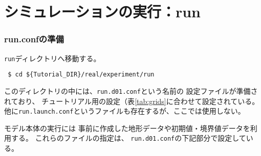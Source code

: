 \section{シミュレーションの実行：run} \label{sec:tutrial_real_run}
\subsubsection{run.confの準備}
\verb|run|ディレクトリへ移動する。
\begin{verbatim}
 $ cd ${Tutorial_DIR}/real/experiment/run
\end{verbatim}
%
このディレクトリの中には、\verb|run.d01.conf|という名前の
設定ファイルが準備されており、
チュートリアル用の設定（表\ref{tab:grids}に合わせて設定されている。
他に\verb|run.launch.conf|というファイルも存在するが、ここでは使用しない。

モデル本体の実行には
事前に作成した地形データや初期値・境界値データを利用する。
これらのファイルの指定は、
\verb|run.d01.conf|の下記部分で設定している。\\

